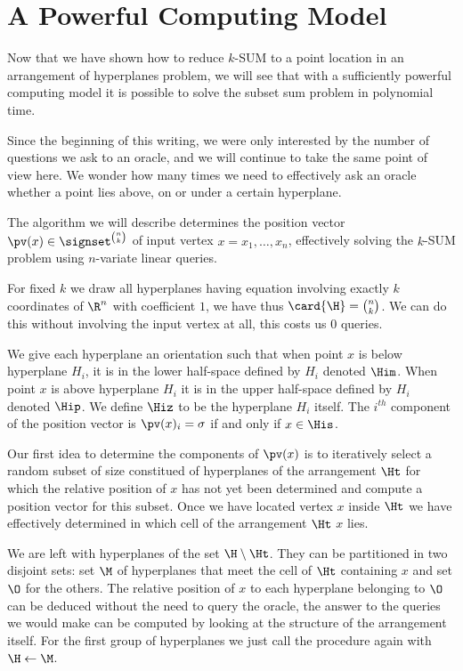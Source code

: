 \section{A Powerful Computing Model}

Now that we have shown how to reduce $k$-SUM to a point location in an
arrangement of hyperplanes problem, we will see that with a sufficiently
powerful computing model it is possible to solve the subset sum problem in
polynomial time.

Since the beginning of this writing, we were only interested by the number of
questions we ask to an oracle, and we will continue to take the same point of
view here. We wonder how many times we need to effectively ask an oracle
whether a point lies above, on or under a certain hyperplane.

The algorithm we will describe determines the position vector $\pv(x) \in
\signset^{\binom{n}{k}} $ of input vertex $x = {x_1, \dots, x_n}$, effectively
solving the $k$-SUM problem using  $n$-variate linear
queries.

For fixed $k$ we draw all hyperplanes having equation involving exactly $k$
coordinates of $\R^n$ with coefficient $1$, we have thus $\card{\H} =
\binom{n}{k}$. We can do this without involving the input vertex at all, this
costs us $0$ queries.

We give each hyperplane an orientation such that when point $x$ is below
hyperplane $H_i$, it is in the lower half-space defined by $H_i$ denoted
$\Him$. When point $x$ is above hyperplane $H_i$ it is in the upper
half-space defined by $H_i$ denoted $\Hip$. We define $\Hiz$ to be the
hyperplane $H_i$ itself. The $i^{th}$ component of the position vector is
$\pv(x)_i = \sigma$ if and only if $x \in \His$.

Our first idea to determine the components of $\pv(x)$ is to iteratively
select a random subset of size  constitued of hyperplanes of the
arrangement $\Ht$ for which the relative position of $x$ has not yet been
determined and compute a position vector for this subset. Once we have located
vertex $x$ inside $\Ht$ we have effectively determined in
which cell of the arrangement $\Ht$ $x$ lies.

We are left with hyperplanes of the set $\H \setminus \Ht$. They can be
partitioned in two disjoint sets: set $\M$ of hyperplanes that meet the cell of
$\Ht$ containing $x$ and set $\O$ for the others. The relative position of $x$
to each hyperplane belonging to $\O$ can be deduced without the need to query
the oracle, the answer to the queries we would make can be computed by looking
at the structure of the arrangement itself. For the first group of hyperplanes
we just call the procedure again with $\H \gets \M$.

